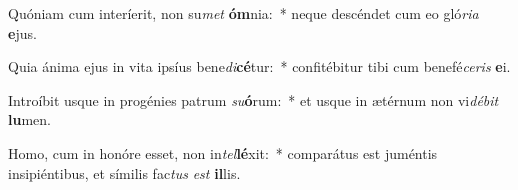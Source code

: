 \item Quóniam cum interíerit, non su\textit{met} \textbf{óm}nia:~* neque descéndet cum eo gló\textit{ri}\textit{a} \textbf{e}jus.
\item Quia ánima ejus in vita ipsíus bene\textit{di}\textbf{cé}tur:~* confitébitur tibi cum benefé\textit{ce}\textit{ris} \textbf{e}i.
\item Introíbit usque in progénies patrum \textit{su}\textbf{ó}rum:~* et usque in ætérnum non vi\textit{dé}\textit{bit} \textbf{lu}men.
\item Homo, cum in honóre esset, non in\textit{tel}\textbf{lé}xit:~* comparátus est juméntis insipiéntibus, et símilis fac\textit{tus} \textit{est} \textbf{il}lis.
